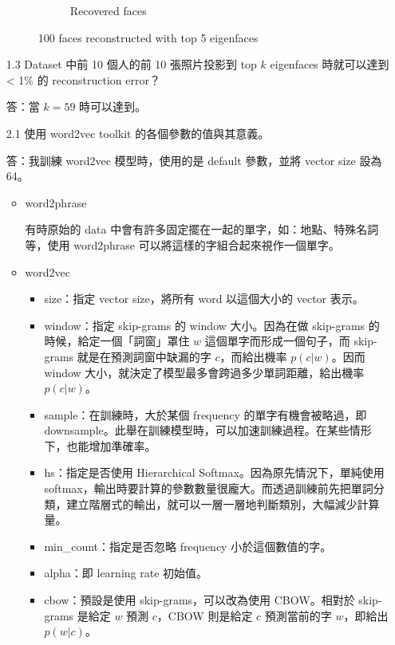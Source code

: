 \documentclass[12pt,a4paper]{extarticle}
\begin{document}
\begin{itemize}
\begin{figure}[ht]
\begin{subfigure}[t]{0.5\textwidth}
      \caption{Recovered faces}
      \label{fig:recovered-faces}
    \end{subfigure}
    \caption{100 faces reconstructed with top 5 eigenfaces}
    \label{fig:reconstruct-with-eigenfaces}
  \end{figure}

  \item[1.3] Dataset 中前 10 個人的前 10 張照片投影到 top $k$ eigenfaces 時就可以達到 < 1\% 的 reconstruction error？
  \par 答：當 $k = 59$ 時可以達到。

  \item[2.1] 使用 word2vec toolkit 的各個參數的值與其意義。
  \par 答：我訓練 word2vec 模型時，使用的是 default 參數，並將 vector size 設為 64。
  \begin{itemize}
    \item word2phrase
    \par 有時原始的 data 中會有許多固定擺在一起的單字，如：地點、特殊名詞等，使用 word2phrase 可以將這樣的字組合起來視作一個單字。
    \item word2vec
    \begin{itemize}
      \item size：指定 vector size，將所有 word 以這個大小的 vector 表示。
      \item window：指定 skip-grams 的 window 大小。因為在做 skip-grams 的時候，給定一個「詞窗」罩住 $w$ 這個單字而形成一個句子，而 skip-grams 就是在預測詞窗中缺漏的字 $c$，而給出機率 $p(c|w)$。因而 window 大小，就決定了模型最多會跨過多少單詞距離，給出機率 $p(c|w)$。
      \item sample：在訓練時，大於某個 frequency 的單字有機會被略過，即 downsample。此舉在訓練模型時，可以加速訓練過程。在某些情形下，也能增加準確率。
      \item hs：指定是否使用 Hierarchical Softmax。因為原先情況下，單純使用 softmax，輸出時要計算的參數數量很龐大。而透過訓練前先把單詞分類，建立階層式的輸出，就可以一層一層地判斷類別，大幅減少計算量。
      \item min\_count：指定是否忽略 frequency 小於這個數值的字。
      \item alpha：即 learning rate 初始值。
      \item cbow：預設是使用 skip-grams，可以改為使用 CBOW。相對於 skip-grams 是給定 $w$ 預測 $c$，CBOW 則是給定 $c$ 預測當前的字 $w$，即給出 $p(w|c)$。
    \end{itemize}
  \end{itemize}


\end{itemize}
\end{document}
